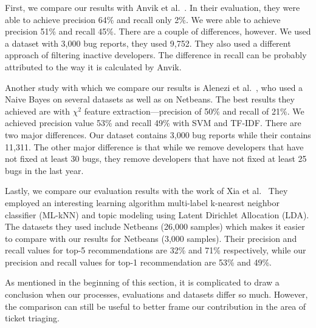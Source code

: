 First, we compare our results with Anvik et al.~\cite{Anvik2006}. In their evaluation, they were able to achieve precision 64\% and recall only 2\%. We were able to achieve precision 51\% and recall 45\%. There are a couple of differences, however. We used a dataset with 3,000 bug reports, they used 9,752. They also used a different approach of filtering inactive developers. The difference in recall can be probably attributed to the way it is calculated by Anvik.

Another study with which we compare our results is Alenezi et al.~\cite{Alenezi2013}, who used a Naive Bayes on several datasets as well as on Netbeans. The best results they achieved are with $\chi^2$ feature extraction---precision of 50\% and recall of 21\%. We achieved precision value 53\% and recall 49\% with SVM and TF-IDF. There are two major differences. Our dataset contains 3,000 bug reports while their contains 11,311. The other major difference is that while we remove developers that have not fixed at least 30 bugs, they remove developers that have not fixed at least 25 bugs in the last year.

Lastly, we compare our evaluation results with the work of Xia et al.~\cite{Xia2015} They employed an interesting learning algorithm multi-label k-nearest neighbor classifier (ML-kNN) and topic modeling using Latent Dirichlet Allocation (LDA). The datasets they used include Netbeans (26,000 samples) which makes it easier to compare with our results for Netbeans (3,000 samples). Their precision and recall values for top-5 recommendations are 32\% and 71\% respectively, while our precision and recall values for top-1 recommendation are 53\% and 49\%.

As mentioned in the beginning of this section, it is complicated to draw a conclusion when our processes, evaluations and datasets differ so much. However, the comparison can still be useful to better frame our contribution in the area of ticket triaging.
